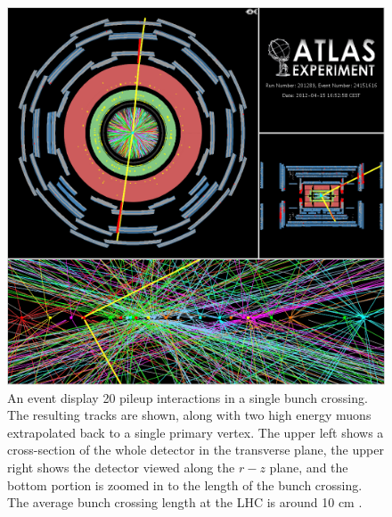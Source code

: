 \begin{figure}[ht!]
\centering
\includegraphics[width=.8\textwidth]{figures/lhc/pileup_vertexing.png}
\caption{An event display 20 pileup interactions in a single bunch crossing. 
The resulting tracks are shown, along with two high energy muons extrapolated back
to a single primary vertex. The upper left shows a cross-section of the whole
detector in the transverse plane, the upper right shows
the detector viewed along the $r-z$ plane, and 
the bottom portion is zoomed in to the length of the bunch crossing. 
The average bunch crossing length at the LHC is around 10 cm \cite{PDG:2014}.  }
\label{fig:lhc_pileup}
\end{figure}

